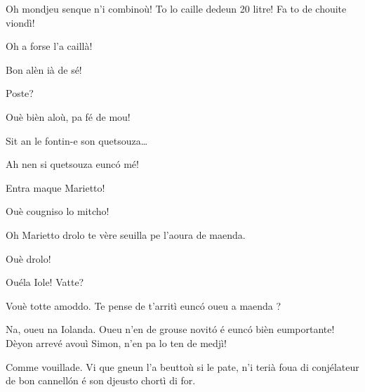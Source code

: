 \begin{drama}

\Sahlammspeaks Oh mondjeu senque n'i combinoù! To lo caille dedeun 20 litre! Fa to de chouite viondì!


\Sahlammspeaks Oh a forse l'a caillà!


\Sahlammspeaks Bon alèn ià de sé!


\Cienspeaks {} Poste?

\Sahlammspeaks Ouè bièn aloù, pa fé de mou!


\Cienspeaks {} Sit an le fontin-e son quetsouza\ldots

\Mariettospeaks Ah nen si quetsouza eunc\'o mé!


\Cienspeaks Entra maque Marietto!

\Mariettospeaks Ouè cougniso lo mitcho!




\Iolandaspeaks Oh Marietto drolo te vère seuilla pe l’aoura de maenda.

\Cienspeaks Ouè drolo!

\Mariettospeaks Ouéla Iole! Vatte?

\Iolandaspeaks Vouè totte amoddo. Te pense de t’arritì eunc\'o oueu a ma\-en\-da ?


\Cienspeaks Na, oueu na Iolanda. Oueu n’en de grouse novit\'o é eunc\'o bièn eumportante! Dèyon arrevé avouì Simon, n'en pa lo ten de medjì!

\Iolandaspeaks Comme vouillade. Vi que gneun l'a beuttoù si le pate, n’i terià foua di conjélateur  de bon cannell\'on é son djeusto chortì di for.


\end{drama}
